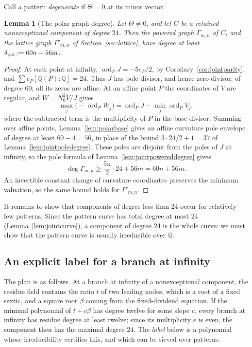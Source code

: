 \documentclass[11pt]{article}
\newtheorem{lemma}[theorem]{Lemma}
\theoremstyle{definition}
\theoremstyle{remark}
\begin{document}
Call a pattern \emph{degenerate} if $\Theta=0$ at its minor vector.

\begin{lemma}[The polar graph degree]\label{lem:polargraphdegree}
Let $\Theta\ne0$, and let $C$ be a retained nonexceptional component of degree
$24$. Then the powered graph $\Gamma_{m,n}$ of $C$, and the lattice graph
$\Gamma'_{m,n}$ of Section~\ref{sec:lattice}, have degree at least
$\delta_{\rm pol}:=60n+56m$.
\end{lemma}

\begin{proof}
At each point at infinity,
$\operatorname{ord}_P J=-5e_P/2$, by Corollary~\ref{cor:jointparity}, and
$\sum e_P[\mathbb Q(P):\mathbb Q]=24$. Thus $J$ has pole divisor, and hence
zero divisor, of degree $60$; all its zeros are affine. At an affine point $P$
the coordinates of $V$ are regular, and $W=N_0^2V/J$ gives
\[
 \max_j\bigl(-\operatorname{ord}_PW_j\bigr)
 =\operatorname{ord}_PJ-\min_j\operatorname{ord}_PV_j,
\]
where the subtracted term is the multiplicity of $P$ in the base divisor. Summing over
affine points, Lemma~\ref{lem:polarbase} gives an affine curvature pole envelope
of degree at least $60-4=56$, in place of the bound $3\cdot24/2+1=37$ of
Lemma~\ref{lem:jointpoledegree}. These poles are disjoint from the poles of $J$
at infinity, so the pole formula of Lemma~\ref{lem:jointpowereddegree} gives
\[
 \deg\Gamma_{m,n}\ge\frac{5n}2\cdot24+56m=60n+56m.
\]
An invertible constant change of curvature coordinates preserves the minimum
valuation, so the same bound holds for $\Gamma'_{m,n}$.
\end{proof}

It remains to show that components of degree less than $24$ occur for
relatively few patterns. Since the pattern curve has total degree at most $24$
(Lemma~\ref{lem:jointcurve}), a component of degree $24$ is the whole curve:
we must show that the pattern curve is usually irreducible over $\mathbb Q$.

\subsection{An explicit label for a branch at infinity}

The plan is as follows. At a branch at infinity of a nonexceptional
component, the residue field contains the ratio $t$ of two leading nodes,
which is a root of a fixed sextic, and a square root $\beta$ coming from the
fixed-dividend equation. If the minimal polynomial of $t+c\beta$ has degree
twelve for some slope $c$, every branch at infinity has residue degree at
least twelve; since its multiplicity $e$ is even, the component then has the
maximal degree $24$. The \emph{label} below is a polynomial whose
irreducibility certifies this, and which can be sieved over patterns.
\end{document}
